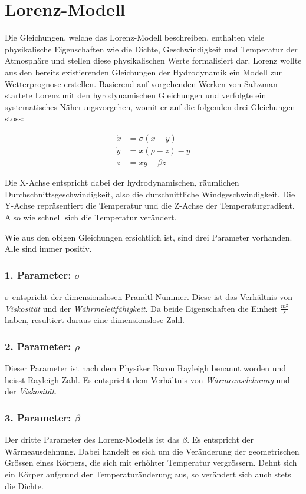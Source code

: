 

\section{Lorenz-Modell}
Die Gleichungen, welche das Lorenz-Modell beschreiben, enthalten viele physikalische Eigenschaften wie die Dichte, Geschwindigkeit und Temperatur der Atmosphäre und stellen diese physikalischen Werte formalisiert dar. Lorenz wollte aus den bereits existierenden Gleichungen der Hydrodynamik ein Modell zur Wetterprognose erstellen. Basierend auf vorgehenden Werken von Saltzman startete Lorenz mit den hyrodynamischen Gleichungen und verfolgte ein systematisches Näherungsvorgehen, womit er auf die folgenden drei Gleichungen stoss:

\begin{align}
\dot{x} &= \sigma(x - y)\\
\dot{y} &= x(\rho - z) - y\\
\dot{z} &= xy - \beta z
\end{align}

Die X-Achse entspricht dabei der hydrodynamischen, räumlichen Durchschnittsgeschwindigkeit, also die durschnittliche Windgeschwindigkeit. Die Y-Achse repräsentiert die Temperatur und die Z-Achse der Temperaturgradient. Also wie schnell sich die Temperatur verändert. 

Wie aus den obigen Gleichungen ersichtlich ist, sind drei Parameter vorhanden. Alle sind immer positiv.

\subsubsection{1. Parameter: $\sigma$}
$\sigma$ entspricht der dimensionslosen Prandtl Nummer. Diese ist das Verhältnis von \textit{Viskosität} und der \textit{Währmeleitfähigkeit}. Da beide Eigenschaften die Einheit $\frac{m^2}{s}$ haben, resultiert daraus eine dimensionslose Zahl.

\subsubsection{2. Parameter: $\rho$}
Dieser Parameter ist nach dem Physiker Baron Rayleigh benannt worden und heisst Rayleigh Zahl. Es entspricht dem Verhältnis von \textit{Wärmeausdehnung} und der \textit{Viskosität}.

\subsubsection{3. Parameter: $\beta$}
Der dritte Parameter des Lorenz-Modells ist das $\beta$. Es entspricht der Wärmeausdehnung. Dabei handelt es sich um die Veränderung der geometrischen Grössen eines Körpers, die sich mit erhöhter Temperatur vergrössern. Dehnt sich ein Körper aufgrund der Temperaturänderung aus, so verändert sich auch stets die Dichte.

